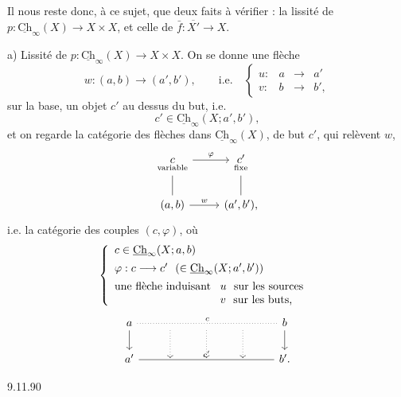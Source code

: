 \documentclass[11pt]{article}
\newcommand{\printedpage}[1]{\marginpar{\footnotesize p.~#1}}
\newcommand{\msp}[1]{\marginpar{\footnotesize [#1]}}
\newcommand{\Ch}{\underline{\mathrm{Ch}}}
\begin{document}
\msp{page 144}
Il nous reste donc, à ce sujet, que deux faits à vérifier : la lissité de $p : \Ch_{\infty}(X) \longrightarrow X \times X$, et celle de $\bar{f} : \overline{X'} \longrightarrow X$.

a) Lissité de $p : \Ch_{\infty}(X) \longrightarrow X \times X$. On se donne une flèche
\[
w : (a,b) \longrightarrow (a',b'), \qquad \text{i.e.} \quad \left\{ \begin{array}{lccc} u : & a & \longrightarrow & a' \\[1ex] v : & b & \longrightarrow & b', \end{array} \right.
\]
sur la base, un objet $c'$ au dessus du but, i.e.
\[
c' \in \Ch_{\infty}(X; a', b'),
\]
et on regarde la catégorie des flèches dans $\Ch_{\infty}(X)$, de but $c'$, qui relèvent $w$,
\[
\begin{tikzcd}
\underset{\text{\scriptsize variable}}{c} \arrow[r, "\varphi"] \arrow[d, dash] & \underset{\text{\scriptsize fixe}}{c'} \arrow[d, dash] \\
(a,b) \arrow[r, "w"] & (a',b'),
\end{tikzcd}
\]
\printedpage{90}
i.e. la catégorie des couples $(c,\varphi)$, où
\[
\left\{ \begin{array}{l}
c \in \Ch_{\infty}(X; a, b) \\[1ex]
\varphi : c \longrightarrow c' \ \ (\in \Ch_{\infty}(X; a', b')) \\[1ex]
\text{une flèche induisant } \begin{array}[t]{l} u \ \text{ sur les sources} \\ v \ \text{ sur les buts,} \end{array}
\end{array} \right.
\]
\[
\begin{tikzcd}
a \arrow[rrrr, dotted, dash, "c"] \arrow[d] & {} \arrow[d, dotted] & {} \arrow[d, dotted] & {} \arrow[d, dotted] & b \arrow[d] \\
a' \arrow[rrrr, dash, "c'"] & {} & {} & {} & b'.
\end{tikzcd}
\]

\msp{page 145}
\begin{flushright}
{\footnotesize 9.11.90}
\end{flushright}
\end{document}
